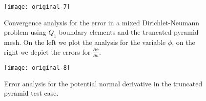 \begin{figure*}
\begin{center}
    \texttt{[image: original-7]}    %
    \caption{Convergence analysis for the error in a mixed Dirichlet-Neumann problem using $Q_1$ boundary elements and the truncated pyramid mesh. On the left we plot the analysis for the variable $\phi$, on the right we depict the errors for $\frac{\partial\phi}{\partial n}$.} 
    \label{fig:original-7}
\end{center}
\end{figure*}

\begin{figure}
\begin{center}
    \texttt{[image: original-8]}    %
    \caption{Error analysis for the potential normal derivative in the truncated pyramid test case.} 
    \label{fig:original-8}
\end{center}
\end{figure}

















